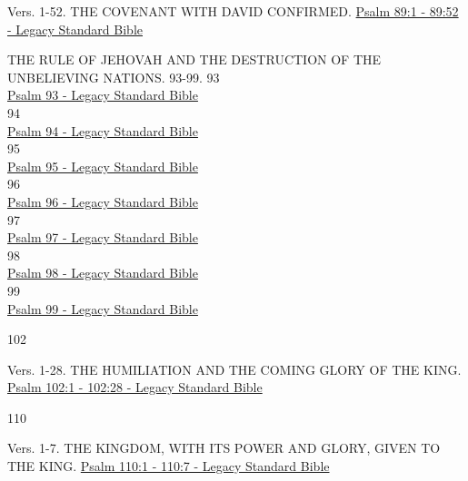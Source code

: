 \documentclass[
  ignorenonframetext,
]{beamer}
\begin{document}
\begin{frame}{89}
\label{section-29}
\begin{block}{Vers. 1-52. THE COVENANT WITH DAVID CONFIRMED.}
\label{vers.-1-52.-the-covenant-with-david-confirmed.}
\href{https://read.lsbible.org/?q=ps89\%3A1-52}{Psalm 89:1 - 89:52 -
Legacy Standard Bible}
\end{block}
\end{frame}

\begin{frame}{THE RULE OF JEHOVAH AND THE DESTRUCTION OF THE UNBELIEVING
NATIONS. 93-99.}
\label{the-rule-of-jehovah-and-the-destruction-of-the-unbelieving-nations.-93-99.}
93\\
\href{https://read.lsbible.org/?q=ps93}{Psalm 93 - Legacy Standard
Bible}\\
94\\
\href{https://read.lsbible.org/?q=ps94}{Psalm 94 - Legacy Standard
Bible}\\
95\\
\href{https://read.lsbible.org/?q=ps95}{Psalm 95 - Legacy Standard
Bible}\\
96\\
\href{https://read.lsbible.org/?q=ps96}{Psalm 96 - Legacy Standard
Bible}\\
97\\
\href{https://read.lsbible.org/?q=ps97}{Psalm 97 - Legacy Standard
Bible}\\
98\\
\href{https://read.lsbible.org/?q=ps98}{Psalm 98 - Legacy Standard
Bible}\\
99\\
\href{https://read.lsbible.org/?q=ps99}{Psalm 99 - Legacy Standard
Bible}
\end{frame}

\begin{frame}{102}
\label{section-30}
\begin{block}{Vers. 1-28. THE HUMILIATION AND THE COMING GLORY OF THE
KING.}
\label{vers.-1-28.-the-humiliation-and-the-coming-glory-of-the-king.}
\href{https://read.lsbible.org/?q=ps102\%3A1-28}{Psalm 102:1 - 102:28 -
Legacy Standard Bible}
\end{block}
\end{frame}

\begin{frame}{110}
\label{section-31}
\begin{block}{Vers. 1-7. THE KINGDOM, WITH ITS POWER AND GLORY, GIVEN TO
THE KING.}
\label{vers.-1-7.-the-kingdom-with-its-power-and-glory-given-to-the-king.}
\href{https://read.lsbible.org/?q=ps110\%3A1-7}{Psalm 110:1 - 110:7 -
Legacy Standard Bible}
\end{block}
\end{frame}
\end{document}
